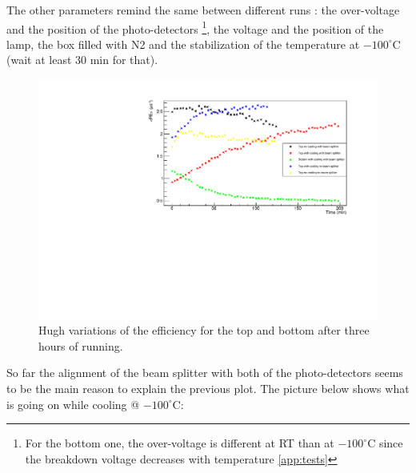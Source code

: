 \documentclass[a4paper, 11pt]{report}%
\begin{document}
  The other parameters remind the same between different runs : the over-voltage and the position of the photo-detectors \footnote{For 
  the bottom one, the over-voltage is different at RT than at  $-100^\circ$C since the breakdown voltage decreases with temperature \ref{app:tests}}, the voltage and the position of the lamp, the box filled with N2 and the stabilization
  of the temperature at $-100^\circ$C (wait at least 30 min for that).\\
 
  \begin{figure}[!hbtp]
    \centering
    \includegraphics[totalheight=0.55\textwidth,trim=0.5cm 0cm 1.8cm 0.5cm, clip=true]{../Pictures/NewLampPEAug5.pdf}
    \caption{Hugh variations of the efficiency for the top and bottom after three hours of running.}
    \label{fig:hugh_variation}
  \end{figure}
  
  \newpage
  
  So far the alignment of the beam splitter with both of the photo-detectors seems to be the main reason to explain the previous plot. 
  The picture below shows what is going on while cooling @ $-100^\circ$C:
  
\end{document}

